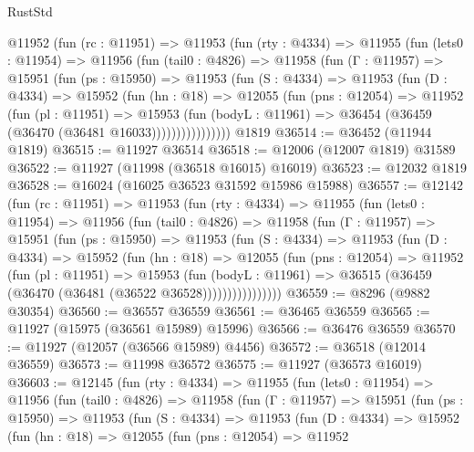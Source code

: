 \begin{lexlean}{RustStd}
\begin{coremodule}
    @11952
      (fun (rc : @11951) =>
      @11953
        (fun (rty : @4334) =>
        @11955
          (fun (lets0 : @11954) =>
          @11956
            (fun (tail0 : @4826) =>
            @11958
              (fun (Γ : @11957) =>
              @15951
                (fun (ps : @15950) =>
                @11953
                  (fun (S : @4334) =>
                  @11953
                    (fun (D : @4334) =>
                    @15952
                      (fun (hn : @18) =>
                      @12055
                        (fun (pns : @12054) =>
                        @11952
                          (fun (pl : @11951) =>
                          @15953
                            (fun (bodyL : @11961) =>
                            @36454 (@36459 (@36470 (@36481 @16033))))))))))))))))
    @1819
@36514 := @36452 (@11944 @1819)
@36515 := @11927 @36514
@36518 := @12006 (@12007 @1819) @31589
@36522 := @11927 (@11998 (@36518 @16015) @16019)
@36523 := @12032 @1819
@36528 := @16024 (@16025 @36523 @31592 @15986 @15988)
@36557 := @12142
    (fun (rc : @11951) =>
    @11953
      (fun (rty : @4334) =>
      @11955
        (fun (lets0 : @11954) =>
        @11956
          (fun (tail0 : @4826) =>
          @11958
            (fun (Γ : @11957) =>
            @15951
              (fun (ps : @15950) =>
              @11953
                (fun (S : @4334) =>
                @11953
                  (fun (D : @4334) =>
                  @15952
                    (fun (hn : @18) =>
                    @12055
                      (fun (pns : @12054) =>
                      @11952
                        (fun (pl : @11951) =>
                        @15953
                          (fun (bodyL : @11961) =>
                          @36515 (@36459 (@36470 (@36481 (@36522 @36528))))))))))))))))
@36559 := @8296 (@9882 @30354)
@36560 := @36557 @36559
@36561 := @36465 @36559
@36565 := @11927 (@15975 (@36561 @15989) @15996)
@36566 := @36476 @36559
@36570 := @11927 (@12057 (@36566 @15989) @4456)
@36572 := @36518 (@12014 @36559)
@36573 := @11998 @36572
@36575 := @11927 (@36573 @16019)
@36603 := @12145
    (fun (rty : @4334) =>
    @11955
      (fun (lets0 : @11954) =>
      @11956
        (fun (tail0 : @4826) =>
        @11958
          (fun (Γ : @11957) =>
          @15951
            (fun (ps : @15950) =>
            @11953
              (fun (S : @4334) =>
              @11953
                (fun (D : @4334) =>
                @15952
                  (fun (hn : @18) =>
                  @12055
                    (fun (pns : @12054) =>
                    @11952

\end{coremodule}
\end{lexlean}
